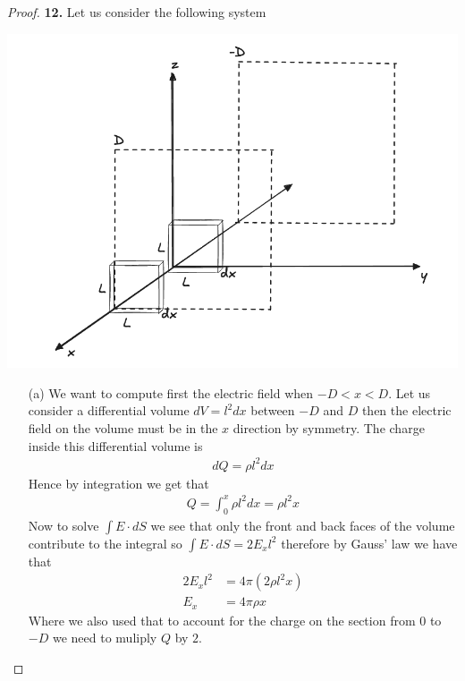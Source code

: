 \documentclass[11pt]{article}
\theoremstyle{definition}
\begin{document}
\begin{proof}{\textbf{12.}}
    Let us consider the following system
    \begin{center}
        \includegraphics[scale=0.3]{ch2-12.png}
    \end{center}
    \begin{itemize}
        \item [(a)] We want to compute first the electric field when
        $-D < x < D$. Let us consider a differential volume $dV = l^2dx$
        between $-D$ and $D$ then the electric field on the volume must be in
        the $x$ direction by symmetry.
        The charge inside this differential volume is
        \begin{align*}
            dQ = \rho l^2 dx
        \end{align*}
        Hence by integration we get that
        \begin{align*}
            Q = \int_0^x \rho l^2 dx = \rho l^2 x
        \end{align*}
        Now to solve $\int E\cdot dS$ we see that only the front and back faces
        of the volume contribute to the integral so $\int E\cdot dS = 2E_x l^2$
        therefore by Gauss' law we have that
        \begin{align*}
            2E_x l^2 &= 4\pi(2\rho l^2 x)\\
            E_x &= 4\pi \rho x
        \end{align*}
        Where we also used that to account for the charge on the section from
        0 to $-D$ we need to muliply $Q$ by $2$.


\end{itemize}
\end{proof}
\end{document}
